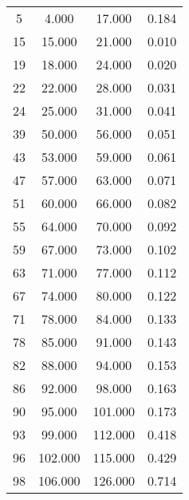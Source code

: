 % 
\begin{tabular}{cccc}
  \hline
  \hline
5 & 4.000 & 17.000 & 0.184 \\ 
  15 & 15.000 & 21.000 & 0.010 \\ 
  19 & 18.000 & 24.000 & 0.020 \\ 
  22 & 22.000 & 28.000 & 0.031 \\ 
  24 & 25.000 & 31.000 & 0.041 \\ 
  39 & 50.000 & 56.000 & 0.051 \\ 
  43 & 53.000 & 59.000 & 0.061 \\ 
  47 & 57.000 & 63.000 & 0.071 \\ 
  51 & 60.000 & 66.000 & 0.082 \\ 
  55 & 64.000 & 70.000 & 0.092 \\ 
  59 & 67.000 & 73.000 & 0.102 \\ 
  63 & 71.000 & 77.000 & 0.112 \\ 
  67 & 74.000 & 80.000 & 0.122 \\ 
  71 & 78.000 & 84.000 & 0.133 \\ 
  78 & 85.000 & 91.000 & 0.143 \\ 
  82 & 88.000 & 94.000 & 0.153 \\ 
  86 & 92.000 & 98.000 & 0.163 \\ 
  90 & 95.000 & 101.000 & 0.173 \\ 
  93 & 99.000 & 112.000 & 0.418 \\ 
  96 & 102.000 & 115.000 & 0.429 \\ 
  98 & 106.000 & 126.000 & 0.714 \\ 
   \hline
\end{tabular}
